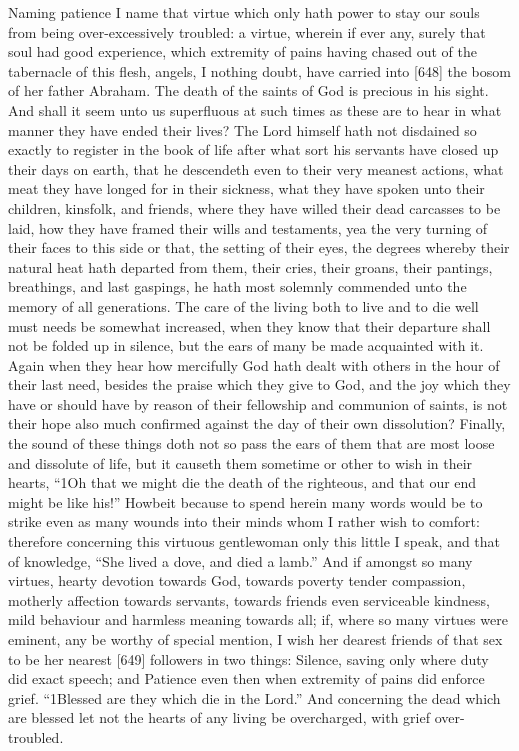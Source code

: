 Naming patience I name that virtue which only hath power to stay our souls from being over-excessively troubled: a virtue, wherein if ever any, surely that soul had good experience, which extremity of pains having chased out of the tabernacle of this flesh, angels, I nothing doubt, have carried into [648] the bosom of her father Abraham. The death of the saints of God is precious in his sight. And shall it seem unto us superfluous at such times as these are to hear in what manner they have ended their lives? The Lord himself hath not disdained so exactly to register in the book of life after what sort his servants have closed up their days on earth, that he descendeth even to their very meanest actions, what meat they have longed for in their sickness, what they have spoken unto their children, kinsfolk, and friends, where they have willed their dead carcasses to be laid, how they have framed their wills and testaments, yea the very turning of their faces to this side or that, the setting of their eyes, the degrees whereby their natural heat hath departed from them, their cries, their groans, their pantings, breathings, and last gaspings, he hath most solemnly commended unto the memory of all generations. The care of the living both to live and to die well must needs be somewhat increased, when they know that their departure shall not be folded up in silence, but the ears of many be made acquainted with it. Again when they hear how mercifully God hath dealt with others in the hour of their last need, besides the praise which they give to God, and the joy which they have or should have by reason of their fellowship and communion of saints, is not their hope also much confirmed against the day of their own dissolution? Finally, the sound of these things doth not so pass the ears of them that are most loose and dissolute of life, but it causeth them sometime or other to wish in their hearts, “1Oh that we might die the death of the righteous, and that our end might be like his!” Howbeit because to spend herein many words would be to strike even as many wounds into their minds whom I rather wish to comfort: therefore concerning this virtuous gentlewoman only this little I speak, and that of knowledge, “She lived a dove, and died a lamb.” And if amongst so many virtues, hearty devotion towards God, towards poverty tender compassion, motherly affection towards servants, towards friends even serviceable kindness, mild behaviour and harmless meaning towards all; if, where so many virtues were eminent, any be worthy of special mention, I wish her dearest friends of that sex to be her nearest [649] followers in two things: Silence, saving only where duty did exact speech; and Patience even then when extremity of pains did enforce grief. “1Blessed are they which die in the Lord.” And concerning the dead which are blessed let not the hearts of any living be overcharged, with grief over-troubled.

